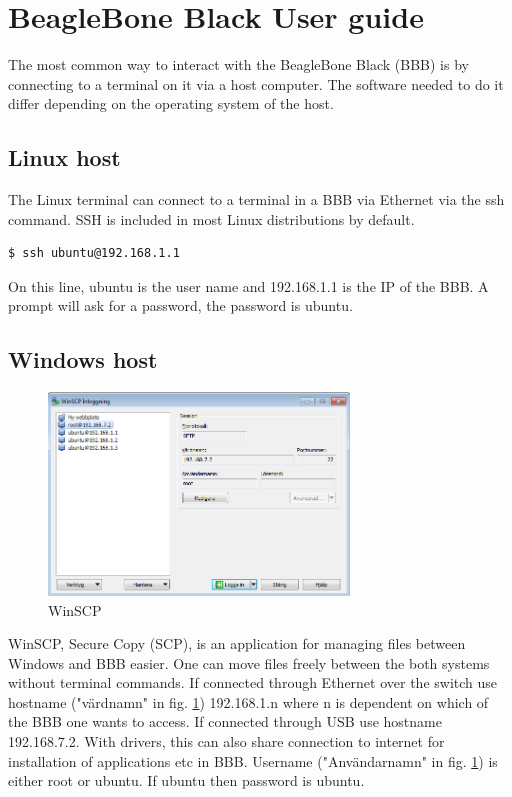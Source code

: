 




\section{BeagleBone Black User guide}
\noindent The most common way to interact with the BeagleBone Black (BBB) is by connecting to a terminal on it via a host computer. The software needed to do it differ depending on the operating system of the host. 


\subsection{Linux host}
\noindent The Linux terminal can connect to a terminal in a BBB via Ethernet via the ssh command. SSH is included in most Linux distributions by default.
\begin{lstlisting}[language=bash]
  $ ssh ubuntu@192.168.1.1 
\end{lstlisting}
\noindent On this line, ubuntu is the user name and 192.168.1.1 is the IP of the BBB. A prompt will ask for a password, the password is ubuntu.


\subsection{Windows host}


\begin{figure}[!ht]
	\begin{center}
		\includegraphics[width=80mm]{./Images/Software/WinSCP.png}
		\caption{WinSCP}
		\label{WinSCP}
	\end{center}
\end{figure}

\noindent WinSCP\cite{WinSCP}, Secure Copy (SCP), is an application for managing files between Windows and BBB easier. One can move files freely between the both systems without terminal commands.
If connected through Ethernet over the switch use hostname ("värdnamn" in fig. \ref{WinSCP}) 192.168.1.n where n is dependent on which of the BBB one wants to access.
If connected through USB use hostname 192.168.7.2. With drivers, this can also share connection to internet for installation of applications etc in BBB.
Username ("Användarnamn" in fig. \ref{WinSCP}) is either root or ubuntu. If ubuntu then password is ubuntu.

